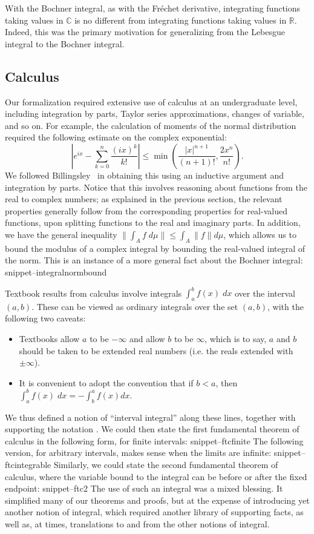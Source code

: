 \documentclass{svjour3}
\newcommand{\RR}{\mathbb{R}}
\newcommand{\CC}{\mathbb{C}}
\newcommand{\Snippet}[1]{\csname snippet--#1\endcsname}
\begin{document}
With the Bochner integral, as with the Fr\'echet derivative, integrating functions taking values in $\CC$ is no different from integrating functions taking values in $\RR$. Indeed, this was the primary motivation for generalizing from the Lebesgue integral to the Bochner integral.

\subsection{Calculus}
\label{subsection:calculus}

Our formalization required extensive use of calculus at an undergraduate level, including integration by parts, Taylor series approximations, changes of variable, and so on. For example, the calculation of moments of the normal distribution required the following estimate on the complex exponential:
\[
 \left| e^{ix} - \sum_{k=0}^n \frac{(ix)^k}{k!} \right| \le \min\left(\frac{|x|^{n+1}}{(n+1)!}, \frac{2 x^n}{n!}\right).
\]
We followed Billingsley~\cite[Section 26]{billingsley:95} in obtaining this using an inductive argument and integration by parts. Notice that this involves reasoning about functions from the real to complex numbers; as explained in the previous section, the relevant properties generally follow from the corresponding properties for real-valued functions, upon splitting functions to the real and imaginary parts. In addition, we have the general inequality $\| \int_A f \; d\mu \| \le \int_A \| f \| d\mu$, which allows us to bound the modulus of a complex integral by bounding the real-valued integral of the norm. This is an instance of a more general fact about the Bochner integral:
\Snippet{integralnormbound}

Textbook results from calculus involve integrals $\int_a^b f(x) \; dx$ over the interval $(a,b)$. These can be viewed as ordinary integrals over the set $(a,b)$, with the following two caveats:
\begin{itemize}
 \item Textbooks allow $a$ to be $-\infty$ and allow $b$ to be $\infty$, which is to say, $a$ and $b$ should be taken to be extended real numbers (i.e. the reals extended with $\pm\infty$).
 \item It is convenient to adopt the convention that if $b < a$, then \\ $\int_a^b f(x) \; dx = -\int_b^a f(x) dx$.
\end{itemize}
We thus defined a notion of ``interval integral'' along these lines, together with supporting the notation . We could then state the first fundamental theorem of calculus in the following form, for finite intervals:
\Snippet{ftcfinite}
The following version, for arbitrary intervals, makes sense when the limits are infinite:
\Snippet{ftcintegrable}
Similarly, we could state the second fundamental theorem of calculus, where the variable bound to the integral can be before or after the fixed endpoint:
\Snippet{ftc2}
The use of such an integral was a mixed blessing. It simplified many of our theorems and proofs, but at the expense of introducing yet another notion of integral, which required another library of supporting facts, as well as, at times, translations to and from the other notions of integral.
\end{document}
